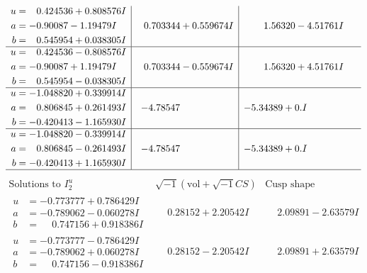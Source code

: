 \documentclass[1p]{elsarticle_modified}
\theoremstyle{definition}
\newcommand{\I}{\sqrt{-1}}
\begin{document}
$$\begin{array}{c|c|c}
\begin{aligned}
u &= \phantom{-}0.424536 + 0.808576 I \\
a &= -0.90087 - 1.19479 I \\
b &= \phantom{-}0.545954 + 0.038305 I\end{aligned}
 & \phantom{-}0.703344 + 0.559674 I & \phantom{-}1.56320 - 4.51761 I \\ \hline\begin{aligned}
u &= \phantom{-}0.424536 - 0.808576 I \\
a &= -0.90087 + 1.19479 I \\
b &= \phantom{-}0.545954 - 0.038305 I\end{aligned}
 & \phantom{-}0.703344 - 0.559674 I & \phantom{-}1.56320 + 4.51761 I \\ \hline\begin{aligned}
u &= -1.048820 + 0.339914 I \\
a &= \phantom{-}0.806845 + 0.261493 I \\
b &= -0.420413 - 1.165930 I\end{aligned}
 & -4.78547\phantom{ +0.000000I} & -5.34389 + 0. I\phantom{ +0.000000I} \\ \hline\begin{aligned}
u &= -1.048820 - 0.339914 I \\
a &= \phantom{-}0.806845 - 0.261493 I \\
b &= -0.420413 + 1.165930 I\end{aligned}
 & -4.78547\phantom{ +0.000000I} & -5.34389 + 0. I\phantom{ +0.000000I}\\
 \hline 
 \end{array}$$\newpage$$\begin{array}{c|c|c}  
\text{Solutions to }I^u_{2}& \I (\text{vol} + \sqrt{-1}CS) & \text{Cusp shape}\\
 \hline 
\begin{aligned}
u &= -0.773777 + 0.786429 I \\
a &= -0.789062 - 0.060278 I \\
b &= \phantom{-}0.747156 + 0.918386 I\end{aligned}
 & \phantom{-}0.28152 + 2.20542 I & \phantom{-}2.09891 - 2.63579 I \\ \hline\begin{aligned}
u &= -0.773777 - 0.786429 I \\
a &= -0.789062 + 0.060278 I \\
b &= \phantom{-}0.747156 - 0.918386 I\end{aligned}
 & \phantom{-}0.28152 - 2.20542 I & \phantom{-}2.09891 + 2.63579 I \\ \hline\begin{aligned}

\end{aligned}
\end{array}$$
\end{document}
